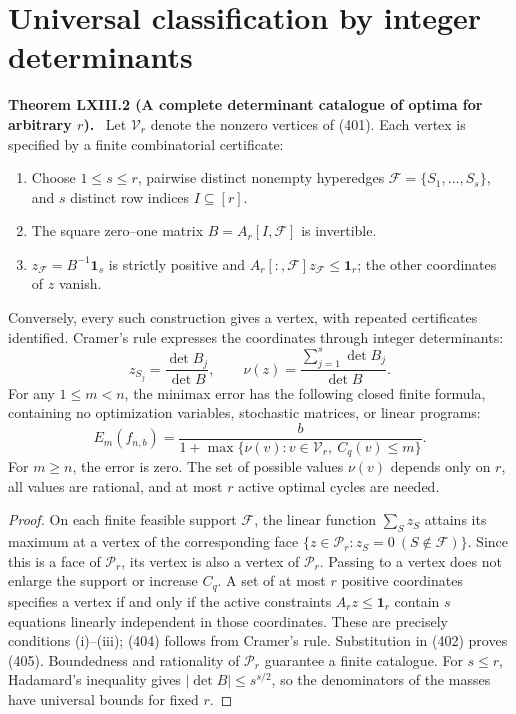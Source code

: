 \documentclass[11pt,a4paper,oneside]{book}
\newcommand{\one}{\mathbf 1}\newcommand{\ii}{\mathrm i}\newcommand{\dd}{\mathrm d}
\newcommand{\statement}[3]{\par\medskip\noindent\textbf{#1 #2 (#3).}\ }
\begin{document}
\section{Universal classification by integer determinants}
\statement{Theorem}{LXIII.2}{A complete determinant catalogue of optima for arbitrary $r$}
Let $\mathcal V_r$ denote the nonzero vertices of (401). Each vertex is specified by a finite combinatorial certificate:
\begin{enumerate}[label=(\roman*)]
\item Choose $1\le s\le r$, pairwise distinct nonempty hyperedges $\mathcal F=\{S_1,\ldots,S_s\}$, and $s$ distinct row indices $I\subseteq[r]$.
\item The square zero--one matrix $B=A_r[I,\mathcal F]$ is invertible.
\item $z_{\mathcal F}=B^{-1}\one_s$ is strictly positive and $A_r[:,\mathcal F]z_{\mathcal F}\le\one_r$; the other coordinates of $z$ vanish.
\end{enumerate}
Conversely, every such construction gives a vertex, with repeated certificates identified. Cramer's rule expresses the coordinates through integer determinants:
\begin{equation}
z_{S_j}=\frac{\det B_j}{\det B},\qquad
\nu(z)=\frac{\sum_{j=1}^s\det B_j}{\det B}.\tag{404}
\end{equation}
For any $1\le m<n$, the minimax error has the following closed finite formula, containing no optimization variables, stochastic matrices, or linear programs:
\begin{equation}
E_m(f_{n,b})=\frac b{1+\max\{\nu(v):v\in\mathcal V_r,\ C_q(v)\le m\}}.\tag{405}
\end{equation}
For $m\ge n$, the error is zero. The set of possible values $\nu(v)$ depends only on $r$, all values are rational, and at most $r$ active optimal cycles are needed.
\begin{proof}
On each finite feasible support $\mathcal F$, the linear function $\sum_Sz_S$ attains its maximum at a vertex of the corresponding face $\{z\in\mathcal P_r:z_S=0\ (S\notin\mathcal F)\}$. Since this is a face of $\mathcal P_r$, its vertex is also a vertex of $\mathcal P_r$. Passing to a vertex does not enlarge the support or increase $C_q$. A set of at most $r$ positive coordinates specifies a vertex if and only if the active constraints $A_rz\le\one_r$ contain $s$ equations linearly independent in those coordinates. These are precisely conditions (i)--(iii); (404) follows from Cramer's rule. Substitution in (402) proves (405). Boundedness and rationality of $\mathcal P_r$ guarantee a finite catalogue. For $s\le r$, Hadamard's inequality gives $|\det B|\le s^{s/2}$, so the denominators of the masses have universal bounds for fixed $r$.
\end{proof}
\end{document}
